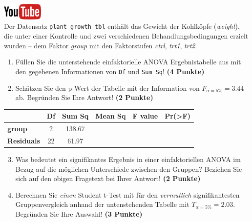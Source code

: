 \documentclass[a4paper, 10pt]{scrartcl}\usepackage[]{graphicx}\usepackage[]{xcolor}
\begin{document}
\hfill\href{https://youtu.be/49hvImMwVyE}{\includegraphics[width =
  2cm]{img/youtube}}\\[1Ex]


Der Datensatz \texttt{plant\_growth\_tbl} enth{\"a}lt das Gewicht der Kohlk{\"o}pfe
(\textit{weight}), die unter einer Kontrolle und zwei verschiedenen
Behandlungsbedingungen erzielt wurden -- dem Faktor \textit{group} mit den
Faktorstufen \textit{ctrl}, \textit{trt1}, \textit{trt2}.



\begin{enumerate}
\item F{\"u}llen Sie die unterstehende einfaktorielle ANOVA Ergebnistabelle aus
  mit den gegebenen Informationen von \texttt{Df} und \texttt{Sum Sq}!
  \textbf{(4 Punkte)}
\item Sch{\"a}tzen Sie den p-Wert der Tabelle mit der Information von
  $F_{\alpha = 5\%} = 3.44$ ab. Begr{\"u}nden Sie Ihre
  Antwort! \textbf{(2 Punkte)}
\end{enumerate}

\vspace{1Ex}

\begin{center}
  \Large
  \begin{tabular}{l|c|c|c|c|c}
     & \textbf{Df} & \textbf{Sum Sq} & \textbf{Mean Sq} & \textbf{F value} & \textbf{Pr(>F)} \strut\\
    \hline
   \textbf{group}  & 2 & 138.67 &  &  &  \strut\\
    \hline
   \textbf{Residuals}  & 22 & 61.97 &  &  &  \strut\\
  \end{tabular}
\end{center}

\vspace{1Ex}

\begin{enumerate}
  \setcounter{enumi}{2}
\item Was bedeutet ein signifikantes Ergebnis in einer einfaktoriellen
  ANOVA im Bezug auf die m{\"o}glichen Unterschiede zwischen den Gruppen? Beziehen Sie sich auf den obigen Fragetext bei Ihrer Antwort!
  \textbf{(2 Punkte)}
\item Berechnen Sie \textit{einen} Student t-Test mit f{\"u}r den \textit{vermutlich}
  signifikantesten Gruppenvergleich anhand der untenstehenden Tabelle mit
  $T_{\alpha = 5\%} = 2.03$. Begr{\"u}nden Sie Ihre Auswahl! \textbf{(3 Punkte)}
\end{enumerate}
\end{document}
